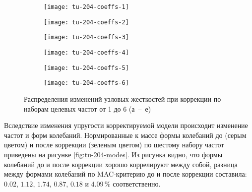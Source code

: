 \def\sfTu204{0.48\textwidth}

\begin{figure}[!htb]
	\centering
	\begin{subfigure}[b]{\sfTu204}
		\texttt{[image: tu-204-coeffs-1]}
		\caption{} \label{subfig:tu-204-coeffs-1}
	\end{subfigure}
	\begin{subfigure}[b]{\sfTu204}
		\texttt{[image: tu-204-coeffs-2]}
		\caption{}
	\end{subfigure}
	\begin{subfigure}[b]{\sfTu204}
		\texttt{[image: tu-204-coeffs-3]}
		\caption{}
	\end{subfigure}	
	\begin{subfigure}[b]{\sfTu204}
		\texttt{[image: tu-204-coeffs-4]}
		\caption{}
	\end{subfigure}	
	\begin{subfigure}[b]{\sfTu204}
		\texttt{[image: tu-204-coeffs-5]}
		\caption{}
	\end{subfigure}
	\begin{subfigure}[b]{\sfTu204}
		\texttt{[image: tu-204-coeffs-6]}
		\caption{} \label{subfig:tu-204-coeffs-6}
	\end{subfigure}
	\caption{Распределения изменений узловых жесткостей при коррекции по наборам целевых частот от 1 до 6 (а~--~е)} \label{fig:tu-204-coeffs}
\end{figure}

Вследствие изменения упругости корректируемой модели происходит изменение частот и форм колебаний. Нормированные к массе формы колебаний до (серым цветом) и после коррекции (зеленым цветом) по шестому набору частот приведены на рисунке \ref{fig:tu-204-modes}. Из рисунка видно, что формы колебаний до и после коррекции хорошо коррелируют между собой, разница между формами колебаний по MAC-критерию до и после коррекции составила: $ 0.02 $, $ 1.12 $, $ 1.74 $, $ 0.87 $, $ 0.18 $ и $ 4.09 $\,\% соответственно.

